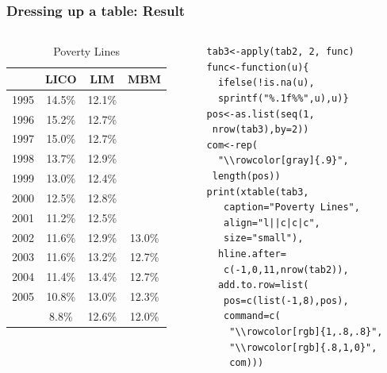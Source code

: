 \documentclass[nogin]{beamer}\usepackage[]{graphicx}\usepackage[]{color}
\begin{document}
\begin{frame}[fragile]
\frametitle{Dressing up a table: Result}
\begin{columns}[T]
\begin{column}{.5\textwidth}
\begin{table}[ht]
\centering
{\small
\begin{tabular}{l||c|c|c}
  \rowcolor[rgb]{1,.8,.8} \hline
 & LICO & LIM & MBM \\ 
  \hline
1995 & 14.5\% & 12.1\% &  \\ 
   \rowcolor[gray]{.9}1996 & 15.2\% & 12.7\% &  \\ 
  1997 & 15.0\% & 12.7\% &  \\ 
   \rowcolor[gray]{.9}1998 & 13.7\% & 12.9\% &  \\ 
  1999 & 13.0\% & 12.4\% &  \\ 
   \rowcolor[gray]{.9}2000 & 12.5\% & 12.8\% &  \\ 
  2001 & 11.2\% & 12.5\% &  \\ 
   \rowcolor[gray]{.9}2002 & 11.6\% & 12.9\% & 13.0\% \\ 
   \rowcolor[rgb]{.8,1,0}2003 & 11.6\% & 13.2\% & 12.7\% \\ 
   \rowcolor[gray]{.9}2004 & 11.4\% & 13.4\% & 12.7\% \\ 
  2005 & 10.8\% & 13.0\% & 12.3\% \\ 
   \rowcolor[gray]{.9} \hline
2011 & 8.8\% & 12.6\% & 12.0\% \\ 
   \hline
\end{tabular}
}
\caption{Poverty Lines} 
\end{table}


\end{column}
\begin{column}{.45\textwidth}
\scriptsize
\begin{lstlisting}
tab3<-apply(tab2, 2, func)
func<-function(u){
  ifelse(!is.na(u),
  sprintf("%.1f%%",u),u)}
pos<-as.list(seq(1,
 nrow(tab3),by=2))
com<-rep(
  "\\rowcolor[gray]{.9}",
 length(pos))
print(xtable(tab3,
   caption="Poverty Lines",
   align="l||c|c|c",
   size="small"),
  hline.after=
   c(-1,0,11,nrow(tab2)),
  add.to.row=list(
   pos=c(list(-1,8),pos),
   command=c(
    "\\rowcolor[rgb]{1,.8,.8}",
    "\\rowcolor[rgb]{.8,1,0}",
    com)))
\end{lstlisting}
\end{column}
\end{columns}
\end{frame}
\end{document}
